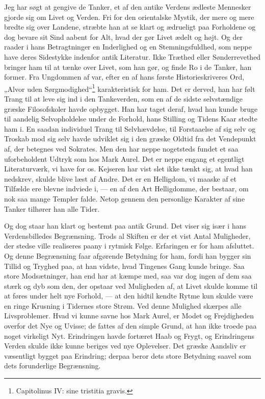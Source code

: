 \documentclass[12pt,a4paper,openany]{book}
\newcommand{\opage}[1]{\marginnote{\footnotesize\textit{[#1]}}}
\begin{document}
Jeg har søgt at gengive de Tanker, et af den antike Verdens
ædleste Mennesker gjorde sig om Livet og Verden. Fri
for den orientalske Mystik, der mere og mere bredte sig over
Landene, stræbte han at se klart og ædrueligt paa Forholdene
og dog bevare sit Sind aabent for Alt, hvad der gør Livet
ædelt og højt. Og der raader i hans Betragtninger en Inderlighed
og en Stemningsfuldhed, som neppe have deres Sidestykke
indenfor antik Literatur. Ikke Træthed eller Sønderrevethed
bringer ham til at tænke over Livet, som han gør, og finde
Ro i de Tanker, han former. Fra Ungdommen af var, efter
\setcounter{footnote}{0}%
\opage{118}en af hans første Historieskriveres Ord, „Alvor uden Sørgmodighed“\footnote[1]{Capitolinus IV: sine tristitia gravis.}
karakteristisk for ham. Det er derved, han har
følt Trang til at leve sig ind i den Tankeverden, som en af de
sidste selvstændige græske Filosofskoler havde opbygget. Han
har taget deraf, hvad han kunde bruge til aandelig Selvopholdelse
under de Forhold, hans Stilling og Tidens Kaar stedte
ham i. En saadan individuel Trang til Selvhævdelse, til Forstaaelse
af sig selv og Troskab mod sig selv havde udviklet
sig i den græske Oldtid fra det Vendepunkt af, der betegnes
ved Sokrates. Men den har neppe nogetsteds fundet et saa
uforbeholdent Udtryk som hos Mark Aurel. Det er neppe engang
et egentligt Literaturværk, vi have for os. Kejseren har
vist slet ikke tænkt sig, at hvad han nedskrev, skulde blive
læst af Andre. Det er en Helligdom, vi maaske af et Tilfælde
ere blevne indviede i, --- en af den Art Helligdomme, der bestaar,
om nok saa mange Templer falde. Netop gennem den
personlige Karakter af sine Tanker tilhører han alle Tider.

Og dog staar han klart og bestemt paa antik Grund. Det
viser sig især i hans Verdensbilledes Begrænsning. Trods al
Skiften er der et vist Antal Muligheder, der stedse ville realiseres
paany i rytmisk Følge. Erfaringen er for ham afsluttet.
Og denne Begrænsning faar afgørende Betydning for ham, fordi
han bygger sin Tillid og Tryghed paa, at han vidste, hvad
Tingenes Gang kunde bringe. Saa store Modsætninger, han
end har at kæmpe med, saa var dog ingen af dem saa stærk
og dyb som den, der opstaar ved Muligheden af, at Livet skulde
komme til at føres under helt nye Forhold, --- at den hidtil
kendte Rytme kun skulde være en ringe Krusning i Tidernes
store Strøm. Ved denne Mulighed skærpes alle Livsproblemer.
Hvad vi kunne savne hos Mark Aurel, er Modet og Frejdigheden
overfor det Nye og Uvisse; de fattes af den simple
Grund, at han ikke troede paa noget virkeligt Nyt. Erindringen
havde fortæret Haab og Frygt, og Erindringens Verden skulde
ikke kunne beriges ved nye Oplevelser. Det græske Aandsliv
\setcounter{footnote}{0}%
\opage{119}er væsentligt bygget paa Erindring; derpaa beror dets store
Betydning saavel som dets forunderlige Begrænsning.
\end{document}
